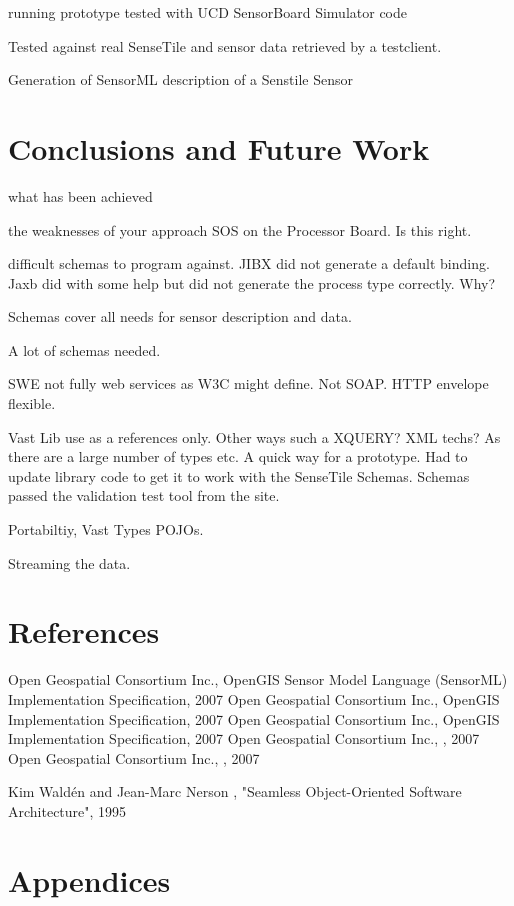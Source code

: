 \documentclass[]{final_report}
\begin{document}
running prototype tested with UCD SensorBoard Simulator code

Tested against real SenseTile and sensor data retrieved by a testclient.

Generation of SensorML description of a Senstile Sensor

\chapter{ Conclusions and Future Work}

what has been achieved

the weaknesses of your approach
SOS on the Processor Board. Is this right.

difficult schemas to program against.
JIBX did not generate a default binding.
Jaxb did with some help but did not generate the process type correctly.
Why?

Schemas cover all needs for sensor description and data.

A lot of schemas needed.

SWE not fully web services as W3C might define. Not SOAP. HTTP envelope
flexible.

Vast Lib use as a references only. Other ways such a XQUERY? XML techs?
As there are a large number of types etc. A quick way for a prototype.
Had to update library code to get it to work with the SenseTile Schemas. Schemas
passed the validation test tool from the site.

Portabiltiy, Vast Types POJOs.

Streaming the data.

\chapter{References}
\newpage
\begin{thebibliography}{99}
Open Geospatial Consortium Inc., OpenGIS Sensor Model Language (SensorML) Implementation Specification, 2007
Open Geospatial Consortium Inc., OpenGIS  Implementation Specification, 2007
Open Geospatial Consortium Inc., OpenGIS  Implementation Specification, 2007
Open Geospatial Consortium Inc., , 2007
Open Geospatial Consortium Inc., , 2007


Kim Waldén and Jean-Marc Nerson , "Seamless Object-Oriented Software Architecture", 1995
\end{thebibliography}
\label{endpage}


\chapter{Appendices}


\end{document}
